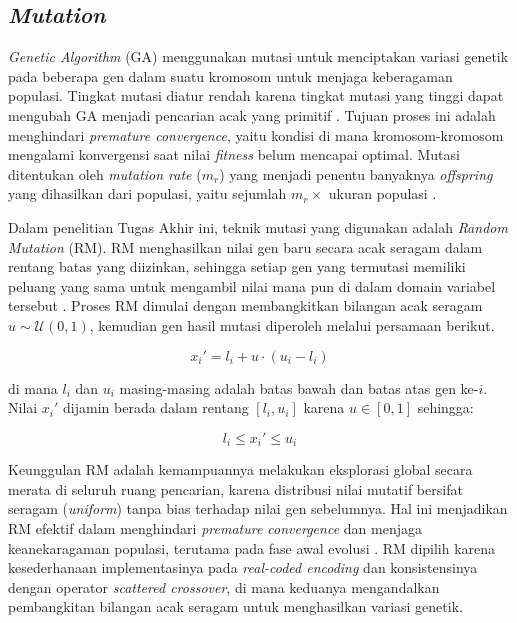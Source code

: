     \subsection{\textit{Mutation}}

    \textit{Genetic Algorithm} (GA) menggunakan mutasi untuk menciptakan variasi genetik pada beberapa gen dalam suatu kromosom untuk menjaga keberagaman populasi. Tingkat mutasi diatur rendah karena tingkat mutasi yang tinggi dapat mengubah GA menjadi pencarian acak yang primitif \cite{Fanggidae2015}. Tujuan proses ini adalah menghindari \textit{premature convergence}, yaitu kondisi di mana kromosom-kromosom mengalami konvergensi saat nilai \textit{fitness} belum mencapai optimal. 
    Mutasi ditentukan oleh \textit{mutation rate} ($m_r$) yang menjadi penentu banyaknya \textit{offspring} yang dihasilkan dari populasi, yaitu sejumlah $m_r \times$ ukuran populasi \cite{mahmudy2013algoritma}.
    
    Dalam penelitian Tugas Akhir ini, teknik mutasi yang digunakan adalah \textit{Random Mutation} (RM). RM menghasilkan nilai gen baru secara acak seragam dalam rentang batas yang diizinkan, sehingga setiap gen yang termutasi memiliki peluang yang sama untuk mengambil nilai mana pun di dalam domain variabel tersebut \cite{Herrera1998}. Proses RM dimulai dengan membangkitkan bilangan acak seragam $u \sim \mathcal{U}(0,1)$, kemudian gen hasil mutasi diperoleh melalui persamaan berikut.
    
    \begin{equation}
        x_i' = l_i + u \cdot (u_i - l_i)
    \end{equation}
    
    \noindent di mana $l_i$ dan $u_i$ masing-masing adalah batas bawah dan batas atas gen ke-$i$. Nilai $x_i'$ dijamin berada dalam rentang $[l_i, u_i]$ karena $u \in [0, 1]$ sehingga:
    
    \begin{equation}
        l_i \leq x_i' \leq u_i
    \end{equation}
    
    \noindent Keunggulan RM adalah kemampuannya melakukan eksplorasi global secara merata di seluruh ruang pencarian, karena distribusi nilai mutatif bersifat seragam (\textit{uniform}) tanpa bias terhadap nilai gen sebelumnya. Hal ini menjadikan RM efektif dalam menghindari \textit{premature convergence} dan menjaga keanekaragaman populasi, terutama pada fase awal evolusi \cite{Michalewicz1996, Herrera1998}. RM dipilih karena kesederhanaan implementasinya pada \textit{real-coded encoding} dan konsistensinya dengan operator \textit{scattered crossover}, di mana keduanya mengandalkan pembangkitan bilangan acak seragam untuk menghasilkan variasi genetik.



    



\endinput